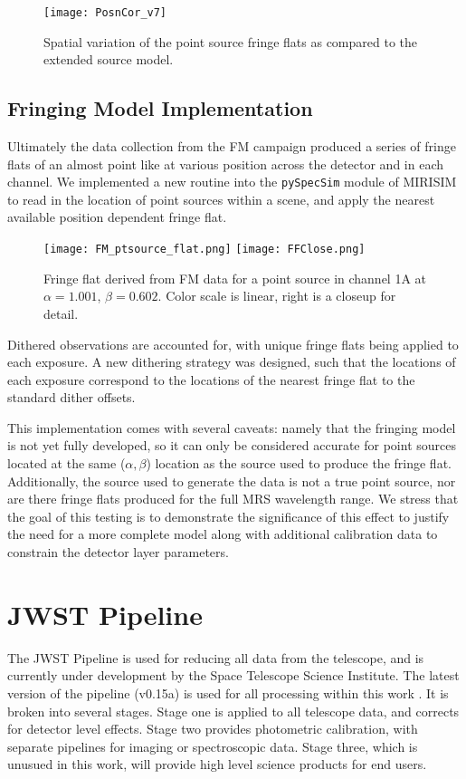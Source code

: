 \begin{figure}[t]
	\centering
	\texttt{[image: PosnCor\_v7]}
	\caption{Spatial variation of the point source fringe flats as compared to the extended source model.}
	\label{fig:fringecor}
\end{figure}
\subsection{Fringing Model Implementation}
Ultimately the data collection from the FM campaign produced a series of fringe flats of an almost point like at various position across the detector and in each channel.
We implemented a new routine into the \verb|pySpecSim| module of MIRISIM to read in the location of point sources within a scene, and apply the nearest available position dependent fringe flat. 

\begin{figure}[t]
	\centering
	\texttt{[image: FM\_ptsource\_flat.png]}
	\texttt{[image: FFClose.png]}	
	\caption{Fringe flat derived from FM data for a point source in channel 1A at $\alpha=1.001$, $\beta=0.602$. Color scale is linear, right is a closeup for detail.}
	\label{fig:ptsrcfringeflat}
\end{figure}
Dithered observations are accounted for, with unique fringe flats being applied to each exposure.
A new dithering strategy was designed, such that the locations of each exposure correspond to the locations of the nearest fringe flat to the standard dither offsets.

This implementation comes with several caveats: namely that the fringing model is not yet fully developed, so it can only be considered accurate for point sources located at the same ($\alpha,\beta$) location as the source used to produce the fringe flat. Additionally, the source used to generate the data is not a true point source, nor are there fringe flats produced for the full MRS wavelength range.
We stress that the goal of this testing is to demonstrate the significance of this effect to justify the need for a more complete model along with additional calibration data to constrain the detector layer parameters.

\section{JWST Pipeline}
The JWST Pipeline is used for reducing all data from the telescope, and is currently under development by the Space Telescope Science Institute. The latest version of the pipeline (v0.15a) is used for all processing within this work \parencite{Bushouse2015}.
It is broken into several stages. 
Stage one is applied to all telescope data, and corrects for detector level effects.
Stage two provides photometric calibration, with separate pipelines for imaging or spectroscopic data.
Stage three, which is unusued in this work, will provide high level science products for end users.%
